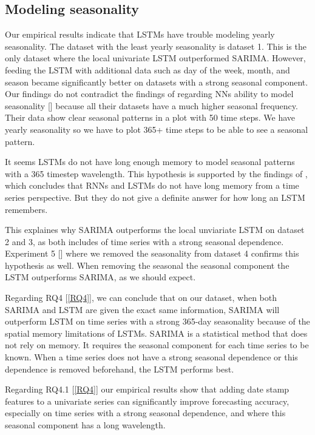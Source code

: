 
\subsection{Modeling seasonality}
Our empirical results indicate that LSTMs have trouble modeling yearly seasonality.
The dataset with the least yearly seasonality is dataset 1. This is the only dataset where
the local univariate LSTM outperformed SARIMA. However, feeding the LSTM with additional
data such as day of the week, month, and season became significantly better on datasets
with a strong seasonal component.
Our findings do not contradict the findings of \cite{Hewamalage2021} regarding NNs ability
to model seasonality []
because all their datasets have a much higher seasonal frequency. Their
data show clear seasonal patterns in a plot with 50 time steps. We have yearly seasonality
so we have to plot 365+ time steps to be able to see a seasonal pattern.

It seems LSTMs do not have long enough memory to model seasonal patterns
with a 365 timestep wavelength.
This hypothesis is supported by the findings of \cite{Zhao2020}, which concludes that
RNNs and LSTMs do not have long memory from a time series perspective.
But they do not give a definite answer for how long an LSTM remembers.

This explaines why SARIMA outperforms the local unviariate LSTM on dataset 2 and 3, as both includes
of time series with a strong seasonal dependence.
Experiment 5 [] where we removed
the seasonality from dataset 4 confirms this hypothesis as well. When removing the seasonal
the seasonal component the LSTM outperforms SARIMA, as we should expect.

Regarding RQ4 [\ref{RQ4}], we can conclude that on our dataset, when
both SARIMA and LSTM are given the exact same information, SARIMA will outperform
LSTM on time series with a strong 365-day seasonality because of the spatial memory limitations
of LSTMs.
SARIMA is a statistical method that does not rely on memory.
It requires the seasonal component for each time series to be known.
When a time series does not have a strong seasonal dependence or this
dependence is removed beforehand, the LSTM performs best.

Regarding RQ4.1 [\ref{RQ4}] our empirical results show that adding date stamp features to
a univariate series can significantly improve forecasting accuracy, especially
on time series with a strong seasonal dependence, and where this seasonal component
has a long wavelength.


